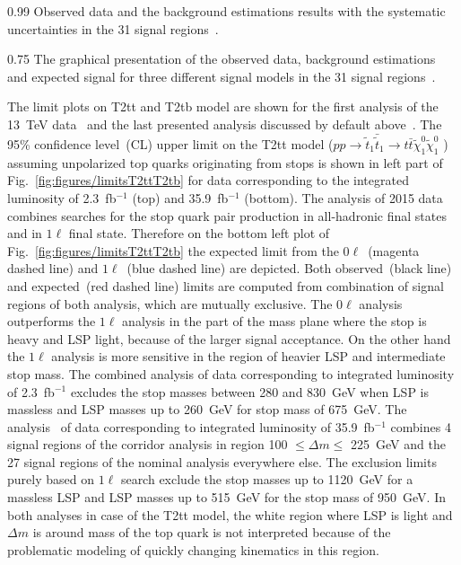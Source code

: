                  {0.99}       %
                 { Observed data and the background estimations results with the systematic uncertainties in the 31 signal regions~\cite{Sirunyan:2017xse}. }

                 {0.75}       %
                 { The graphical presentation of the observed data, background estimations and expected signal for three different signal models in the 31 signal regions~\cite{Sirunyan:2017xse}. }

The limit plots on T2tt and T2tb model are shown for the first analysis of the 13~TeV data~\cite{Sirunyan:2016jpr} and the last presented analysis discussed by default above~\cite{Sirunyan:2017xse}. The 95\% confidence level~(CL) upper limit on the T2tt model ($ pp \to \tilde{t}_{1} \bar{\tilde{t}}_{1} \to t \bar{t} \tilde{\chi}^{0}_{1} \tilde{\chi}^{0}_{1}$ ) assuming unpolarized top quarks originating from stops is shown in left part of Fig.~\ref{fig:figures/limitsT2ttT2tb} for data corresponding to the integrated luminosity of 2.3~fb$^{-1}$ (top) and 35.9~fb$^{-1}$ (bottom). The analysis of 2015 data~\cite{Sirunyan:2016jpr} combines searches for the stop quark pair production in all-hadronic final states and in $1\ell$ final state. Therefore on the bottom left plot of Fig.~\ref{fig:figures/limitsT2ttT2tb} the expected limit from the $0\ell$~(magenta dashed line) and $1\ell$~(blue dashed line) are depicted. Both observed~(black line) and expected~(red dashed line) limits are computed from combination of signal regions of both analysis, which are mutually exclusive. The $0\ell$ analysis outperforms the $1\ell$ analysis in the part of the mass plane where the stop is heavy and LSP light, because of the larger signal acceptance. On the other hand the $1\ell$ analysis is more sensitive in the region of heavier LSP and intermediate stop mass. The combined analysis of data corresponding to integrated luminosity of 2.3~fb$^{-1}$ excludes the stop masses between 280 and 830~GeV when LSP is massless and LSP masses up to 260~GeV for stop mass of 675~GeV. The analysis~\cite{Sirunyan:2017xse} of data corresponding to integrated luminosity of 35.9~fb$^{-1}$ combines 4 signal regions of the corridor analysis in region 100 $\leq \Delta m \leq $ 225~GeV and the 27 signal regions of the nominal analysis everywhere else. The exclusion limits purely based on $1\ell$ search exclude  the stop masses up to 1120~GeV for a massless LSP and LSP masses up to 515~GeV for the stop mass of 950~GeV. In both analyses in case of the T2tt model, the white region where LSP is light and $\Delta m$ is around mass of the top quark is not interpreted because of the problematic modeling of quickly changing kinematics in this region.


